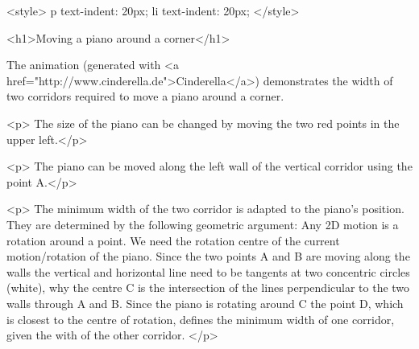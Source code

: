 <style>
p {
  text-indent: 20px;
}
li {
  text-indent: 20px;
}
</style>

<h1>Moving a piano around a corner</h1> 

The animation (generated with <a
    href="http://www.cinderella.de">Cinderella</a>) demonstrates the width of two corridors required to move a piano around a corner.
    
<p> The size of the piano can be changed by moving the two red points in the upper left.</p>

<p> The piano can be moved along the left wall of the vertical corridor using the point A.</p>

<p>  The minimum width of the two corridor is adapted to the piano's position. They are determined by the following geometric argument: Any 2D motion is a rotation around a point. We need the rotation centre of the current motion/rotation of the piano. Since the two points A and B are moving along the walls the vertical and horizontal line need to be tangents at two concentric circles (white), why the centre C is the intersection of the lines perpendicular to the two walls through A and B. Since the piano is rotating around C the point D, which is closest to the centre of rotation, defines the minimum width of one corridor, given the with of the other corridor. </p>
    